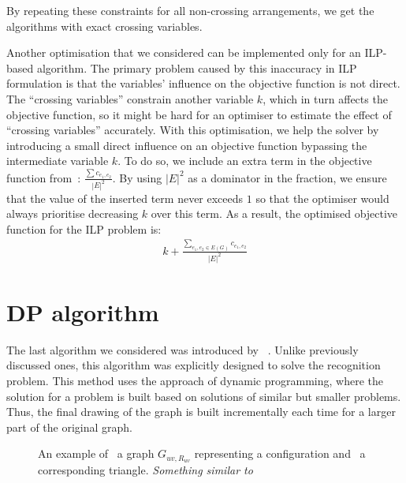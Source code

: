 By repeating these constraints for all non-crossing arrangements, we get the algorithms with exact crossing variables.

Another optimisation that we considered can be implemented only for an ILP-based algorithm. The primary problem caused by this inaccuracy in ILP formulation is that the variables' influence on the objective function is not direct. The ``crossing variables'' constrain another variable \(k\), which in turn affects the objective function, so it might be hard for an optimiser to estimate the effect of ``crossing variables'' accurately. With this optimisation, we help the solver by introducing a small direct influence on an objective function bypassing the intermediate variable \(k\). To do so, we include an extra term in the objective function from~: \(\frac{\sum c_{e_1, e_2}}{|E|^2}\). By using \(|E|^2\) as a dominator in the fraction, we ensure that the value of the inserted term never exceeds \(1\) so that the optimiser would always prioritise decreasing \(k\) over this term. As a result, the optimised objective function for the ILP problem is:
\begin{gather*}
    k + \frac{\sum_{e_1, e_2 \in E(G)} c_{e_1, e_2}}{|E|^2}
\end{gather*}


\section{DP algorithm}\label{sec:DP-def}

The last algorithm we considered was introduced by \citeauthor{okp}~\cite{okp}. Unlike previously discussed ones, this algorithm was explicitly designed to solve the recognition problem. This method uses the approach of dynamic programming, where the solution for a problem is built based on solutions of similar but smaller problems. Thus, the final drawing of the graph is built incrementally each time for a larger part of the original graph.

\begin{figure}[tbh]
    \centering
    \captionsetup{subrefformat=parens}
    \hfill
    \caption{
        An example of \protect{}~a graph \(G_{uv, R_{uv}}\) representing a configuration and \protect{}~a corresponding triangle.
        \emph{Something similar to\cite[Figure 4]{okp}}
    }
\end{figure}

